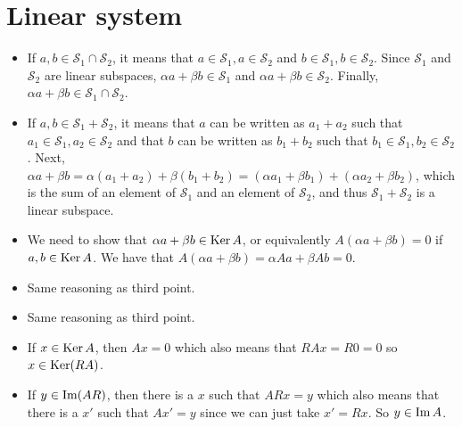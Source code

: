 \section{Linear system}
\begin{solution}
  \begin{itemize}
    \item If $a, b \in \mathcal{S}_1 \cap \mathcal{S}_2$,
      it means that $a \in \mathcal{S}_1, a \in \mathcal{S}_2$
      and $b \in \mathcal{S}_1, b \in \mathcal{S}_2$.
      Since $\mathcal{S}_1$ and $\mathcal{S}_2$
      are linear subspaces, $\alpha a + \beta b \in \mathcal{S}_1$
      and $\alpha a + \beta b \in \mathcal{S}_2$.
      Finally, $\alpha a + \beta b \in \mathcal{S}_1 \cap \mathcal{S}_2$.
    \item If $a,b \in \mathcal{S}_1 + \mathcal{S}_2$,
       it means that $a$ can be written as $a_1 + a_2$
       such that $a_1 \in \mathcal{S}_1, a_2 \in \mathcal{S}_2$
       and that $b$ can be written as $b_1 + b_2$
       such that $b_1 \in \mathcal{S}_1, b_2 \in \mathcal{S}_2$.
       Next, $\alpha a + \beta b = \alpha (a_1 + a_2) + \beta (b_1 + b_2)
       =(\alpha a_1 + \beta b_1) + (\alpha a_2 + \beta b_2)$,
       which is the sum of an element of $\mathcal{S}_1$ and
       an element of $\mathcal{S}_2$, and thus $\mathcal{S}_1 + \mathcal{S}_2$
       is a linear subspace.
    \item We need to show that $\alpha a + \beta b \in \operatorname{Ker} A$,
      or equivalently $A(\alpha a + \beta b) = 0$
      if $a, b \in \operatorname{Ker} A$.
      We have that $A(\alpha a + \beta b) = \alpha Aa + \beta Ab = 0$.
    \item Same reasoning as third point.
    \item Same reasoning as third point.
  \end{itemize}
\end{solution}

\begin{solution}
  \begin{itemize}
    \item If $x \in \operatorname{Ker} A$, then $Ax = 0$
      which also means that $RAx = R0 = 0$ so $x \in \operatorname{Ker}(RA)$.
    \item If $y \in \operatorname{Im}(AR)$, then there is a $x$
      such that $ARx = y$
      which also means that there is a $x'$ such that
      $Ax' = y$ since we can just take $x' = Rx$.
      So $y \in \operatorname{Im} A$.
  \end{itemize}
\end{solution}

